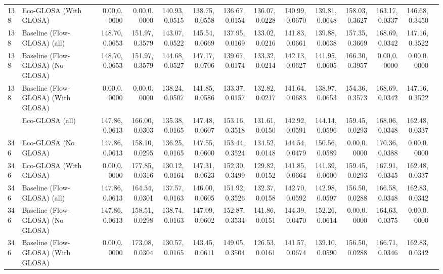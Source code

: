 \begin{table}[ht]
{\begin{tabular}{llrrrrrrrrrrrr}
        138  & Eco-GLOSA (With GLOSA)             & 0.00,0.0000   & 0.00,0.0000   & 140.93,0.0515 & 138.75,0.0558 & 136.67,0.0154 & 136.07,0.0228 & 140.99,0.0670 & 139.81,0.0648 & 158.03,0.3627 & 163.17,0.0337 & 146.68,0.3450 \\
        138  & Baseline (Flow-GLOSA) (all)        & 148.70,0.0653 & 151.97,0.3579 & 143.07,0.0522 & 145.54,0.0669 & 137.95,0.0169 & 133.02,0.0216 & 141.83,0.0661 & 139.88,0.0638 & 157.35,0.3669 & 168.69,0.0342 & 147.16,0.3522 \\
        138  & Baseline (Flow-GLOSA) (No GLOSA)   & 148.70,0.0653 & 151.97,0.3579 & 144.68,0.0527 & 147.17,0.0706 & 139.67,0.0174 & 133.32,0.0214 & 142.13,0.0627 & 141.95,0.0605 & 166.30,0.3957 & 0.00,0.0000   & 0.00,0.0000   \\
        138  & Baseline (Flow-GLOSA) (With GLOSA) & 0.00,0.0000   & 0.00,0.0000   & 138.24,0.0507 & 141.85,0.0586 & 133.37,0.0157 & 132.82,0.0217 & 141.64,0.0683 & 138.97,0.0653 & 154.36,0.3573 & 168.69,0.0342 & 147.16,0.3522 \\
        \addlinespace
        346  & Eco-GLOSA (all)                    & 147.86,0.0613 & 166.00,0.0303 & 135.38,0.0165 & 147.48,0.0607 & 153.16,0.3518 & 131.61,0.0150 & 142.92,0.0591 & 144.14,0.0596 & 159.45,0.0293 & 168.06,0.0348 & 162.48,0.0337 \\
        346  & Eco-GLOSA (No GLOSA)               & 147.86,0.0613 & 158.10,0.0295 & 136.25,0.0165 & 147.55,0.0600 & 153.44,0.3524 & 134.52,0.0148 & 144.54,0.0479 & 150.56,0.0589 & 0.00,0.0000   & 170.36,0.0388 & 0.00,0.0000   \\
        346  & Eco-GLOSA (With GLOSA)             & 0.00,0.0000   & 177.85,0.0316 & 130.12,0.0164 & 147.31,0.0623 & 152.30,0.3499 & 129.82,0.0152 & 141.85,0.0664 & 141.39,0.0600 & 159.45,0.0293 & 167.91,0.0345 & 162.48,0.0337 \\
        346  & Baseline (Flow-GLOSA) (all)        & 147.86,0.0613 & 164.34,0.0301 & 137.57,0.0163 & 146.00,0.0605 & 151.92,0.3526 & 132.37,0.0158 & 142.70,0.0592 & 142.98,0.0597 & 156.50,0.0288 & 166.58,0.0348 & 162.83,0.0342 \\
        346  & Baseline (Flow-GLOSA) (No GLOSA)   & 147.86,0.0613 & 158.51,0.0298 & 138.74,0.0163 & 147.09,0.0602 & 152.87,0.3534 & 141.86,0.0151 & 144.39,0.0470 & 152.26,0.0614 & 0.00,0.0000   & 164.63,0.0375 & 0.00,0.0000   \\
        346  & Baseline (Flow-GLOSA) (With GLOSA) & 0.00,0.0000   & 173.08,0.0304 & 130.57,0.0165 & 143.45,0.0611 & 149.05,0.3504 & 126.53,0.0161 & 141.57,0.0674 & 139.10,0.0590 & 156.50,0.0288 & 166.71,0.0346 & 162.83,0.0342 \\

\end{tabular}}
\end{table}
